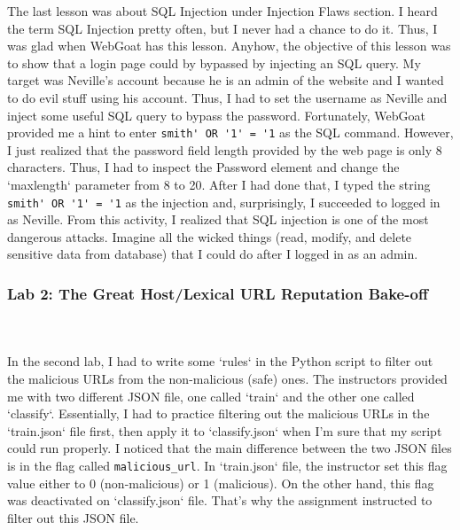\documentclass[letterpaper,10pt,titlepage,draftclsnofoot,onecolumn]{IEEEtran}
\begin{document}
The last lesson was about SQL Injection under Injection Flaws section.
I heard the term SQL Injection pretty often, but I never had a chance to do it.
Thus, I was glad when WebGoat has this lesson.
Anyhow, the objective of this lesson was to show that a login page could by bypassed by injecting an SQL query.
My target was Neville's account because he is an admin of the website and I wanted to do evil stuff using his account. 
Thus, I had to set the username as Neville and inject some useful SQL query to bypass the password.
Fortunately, WebGoat provided me a hint to enter \verb|smith' OR '1' = '1| as the SQL command.
However, I just realized that the password field length provided by the web page is only 8 characters. 
Thus, I had to inspect the Password element and change the `maxlength` parameter from 8 to 20.
After I had done that, I typed the string \verb|smith' OR '1' = '1| as the injection and, surprisingly, I succeeded to logged in as Neville.
From this activity, I realized that SQL injection is one of the most dangerous attacks. 
Imagine all the wicked things (read, modify, and delete sensitive data from database) that I could do after I logged in as an admin. 
\hfill\\
\subsubsection{Lab 2: The Great Host/Lexical URL Reputation Bake-off}
\hfill\\\hfill\\
In the second lab, I had to write some `rules` in the Python script to filter out the malicious URLs from the non-malicious (safe) ones.
The instructors provided me with two different JSON file, one called `train` and the other one called `classify`.
Essentially, I had to practice filtering out the malicious URLs in the `train.json` file first, then apply it to `classify.json` when I'm sure that my script could run properly. 
I noticed that the main difference between the two JSON files is in the flag called \verb|malicious_url|.
In `train.json` file, the instructor set this flag value either to 0 (non-malicious) or 1 (malicious). 
On the other hand, this flag was deactivated on `classify.json` file. That's why the assignment instructed to filter out this JSON file.
\end{document}
